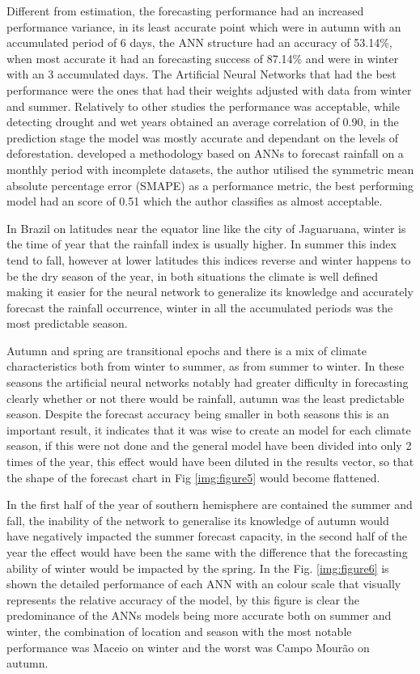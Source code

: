 Different from estimation, the forecasting performance had an increased performance variance, in its least accurate point which were in autumn with an accumulated period of 6 days, the ANN structure had an accuracy of 53.14\%, when most accurate it had an forecasting success of 87.14\% and were in winter with an 3 accumulated days. The Artificial Neural Networks that had the best performance were the ones that had their weights adjusted with data from winter and summer.  Relatively to other studies the performance was acceptable, \citeauthor{valipour2016optimization}  \citeyear{valipour2016optimization} while detecting drought and wet years obtained an average correlation of 0.90, in the prediction stage the model was mostly accurate and dependant on the levels of deforestation. \citeauthor{rivero2015short} \citeyear{rivero2015short} developed a methodology based on ANNs to forecast rainfall on a monthly period with incomplete datasets, the author utilised the symmetric mean absolute percentage error (SMAPE) as a performance metric, the best performing model had an score of 0.51 which the author classifies as almost acceptable.

In Brazil on latitudes near the equator line like the city of Jaguaruana, winter is the time of year that the rainfall index is usually higher. In summer this index tend to fall, however at lower latitudes this indices reverse and winter happens to be the dry season of the year, in both situations the climate is well defined making it easier for the neural network to generalize its knowledge and accurately forecast the rainfall occurrence, winter in all the accumulated periods was the most predictable season.
  
Autumn and spring are transitional epochs and there is a mix of climate characteristics both from winter to summer, as from summer to winter. In these seasons the artificial neural networks notably had greater difficulty in forecasting clearly whether or not there would be rainfall, autumn was the least predictable season. 
Despite the forecast accuracy being smaller in both seasons this is an important result, it indicates that it was wise to create an model for each climate season, if this were not done and the general model have been divided into only 2 times of the year, this effect would have been diluted in the results vector, so that the shape of the forecast chart in Fig \ref{img:figure5} would become flattened. 

In the first half of the year of southern hemisphere are contained the summer and fall, the inability of the network to generalise its knowledge of autumn would have negatively impacted the summer forecast capacity, in the second half of the year the effect would have been the same with the difference that the forecasting ability of winter would be impacted by the spring. In the Fig. \ref{img:figure6} is shown the detailed performance of each ANN with an colour scale that visually represents the relative accuracy of the model, by this figure is clear the predominance of the ANNs models being more accurate both on summer and winter, the combination of location and season with the most notable performance was Maceio on winter and the worst was Campo Mourão on autumn.  

